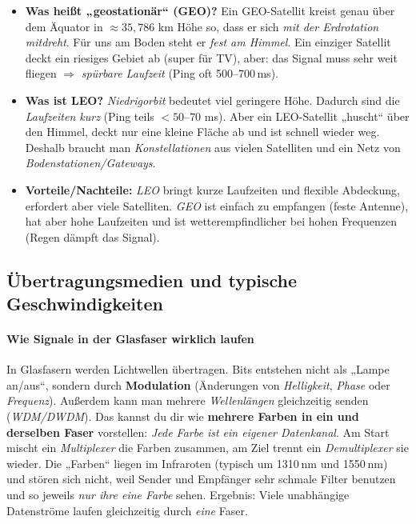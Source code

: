 \documentclass[../skript/main.tex]{subfiles}
\begin{document}
	
	\begin{itemize}
		\item \textbf{Was heißt „geostationär“ (GEO)?} Ein GEO-Satellit kreist genau über dem Äquator in \(\approx 35{,}786\) km Höhe so, dass er sich \emph{mit der Erdrotation mitdreht}. Für uns am Boden steht er \emph{fest am Himmel}. Ein einziger Satellit deckt ein riesiges Gebiet ab (super für TV), aber: das Signal muss sehr weit fliegen \(\Rightarrow\) \emph{spürbare Laufzeit} (Ping oft 500--700\,ms).
		\item \textbf{Was ist LEO?} \emph{Niedrigorbit} bedeutet viel geringere Höhe. Dadurch sind die \emph{Laufzeiten kurz} (Ping teils \(< 50\)–\(70\) ms). Aber ein LEO-Satellit „huscht“ über den Himmel, deckt nur eine kleine Fläche ab und ist schnell wieder weg. Deshalb braucht man \emph{Konstellationen} aus vielen Satelliten und ein Netz von \emph{Bodenstationen/Gateways}.
		\item \textbf{Vorteile/Nachteile:} \emph{LEO} bringt kurze Laufzeiten und flexible Abdeckung, erfordert aber viele Satelliten. \emph{GEO} ist einfach zu empfangen (feste Antenne), hat aber hohe Laufzeiten und ist wetterempfindlicher bei hohen Frequenzen (Regen dämpft das Signal).
	\end{itemize}

	
	\subsection{Übertragungsmedien und typische Geschwindigkeiten}

	

	\paragraph{Wie Signale in der Glasfaser wirklich laufen}
	In Glasfasern werden Lichtwellen übertragen. Bits entstehen nicht als „Lampe an/aus“, sondern durch \textbf{Modulation} (Änderungen von \emph{Helligkeit}, \emph{Phase} oder \emph{Frequenz}). Außerdem kann man mehrere \emph{Wellenlängen} gleichzeitig senden (\emph{WDM/DWDM}). Das kannst du dir wie \textbf{mehrere Farben in ein und derselben Faser} vorstellen: \emph{Jede Farbe ist ein eigener Datenkanal}. Am Start mischt ein \emph{Multiplexer} die Farben zusammen, am Ziel trennt ein \emph{Demultiplexer} sie wieder. Die „Farben“ liegen im Infraroten (typisch um 1310 nm und 1550 nm) und stören sich nicht, weil Sender und Empfänger sehr schmale Filter benutzen und so jeweils \emph{nur ihre eine Farbe} sehen. Ergebnis: Viele unabhängige Datenströme laufen gleichzeitig durch \emph{eine} Faser.
	
\end{document}
